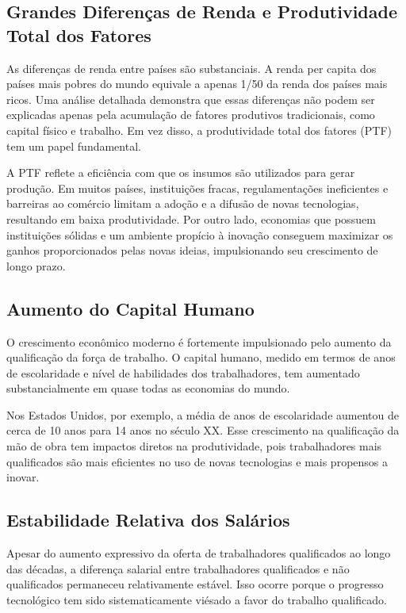 \documentclass[a4paper,12pt]{article}[abntex2]
\begin{document}
\subsection{Grandes Diferenças de Renda e Produtividade Total dos Fatores}
As diferenças de renda entre países são substanciais. A renda per capita dos países mais pobres do mundo equivale a apenas 1/50 da renda dos países mais ricos. Uma análise detalhada demonstra que essas diferenças não podem ser explicadas apenas pela acumulação de fatores produtivos tradicionais, como capital físico e trabalho. Em vez disso, a produtividade total dos fatores (PTF) tem um papel fundamental.

A PTF reflete a eficiência com que os insumos são utilizados para gerar produção. Em muitos países, instituições fracas, regulamentações ineficientes e barreiras ao comércio limitam a adoção e a difusão de novas tecnologias, resultando em baixa produtividade. Por outro lado, economias que possuem instituições sólidas e um ambiente propício à inovação conseguem maximizar os ganhos proporcionados pelas novas ideias, impulsionando seu crescimento de longo prazo.

\subsection{Aumento do Capital Humano}
O crescimento econômico moderno é fortemente impulsionado pelo aumento da qualificação da força de trabalho. O capital humano, medido em termos de anos de escolaridade e nível de habilidades dos trabalhadores, tem aumentado substancialmente em quase todas as economias do mundo.

Nos Estados Unidos, por exemplo, a média de anos de escolaridade aumentou de cerca de 10 anos para 14 anos no século XX. Esse crescimento na qualificação da mão de obra tem impactos diretos na produtividade, pois trabalhadores mais qualificados são mais eficientes no uso de novas tecnologias e mais propensos a inovar.

\subsection{Estabilidade Relativa dos Salários}
Apesar do aumento expressivo da oferta de trabalhadores qualificados ao longo das décadas, a diferença salarial entre trabalhadores qualificados e não qualificados permaneceu relativamente estável. Isso ocorre porque o progresso tecnológico tem sido sistematicamente viésado a favor do trabalho qualificado.
\end{document}
